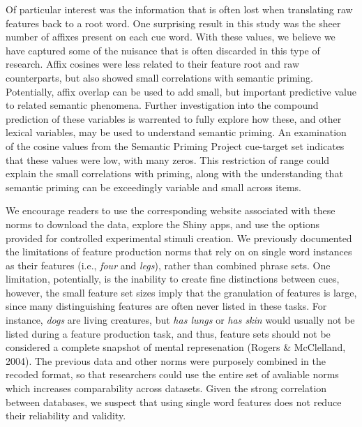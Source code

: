 \documentclass[english,man]{apa6}
\theoremstyle{definition}
\theoremstyle{definition}
\theoremstyle{definition}
\theoremstyle{remark}
\begin{document}
Of particular interest was the information that is often lost when
translating raw features back to a root word. One surprising result in
this study was the sheer number of affixes present on each cue word.
With these values, we believe we have captured some of the nuisance that
is often discarded in this type of research. Affix cosines were less
related to their feature root and raw counterparts, but also showed
small correlations with semantic priming. Potentially, affix overlap can
be used to add small, but important predictive value to related semantic
phenomena. Further investigation into the compound prediction of these
variables is warrented to fully explore how these, and other lexical
variables, may be used to understand semantic priming. An examination of
the cosine values from the Semantic Priming Project cue-target set
indicates that these values were low, with many zeros. This restriction
of range could explain the small correlations with priming, along with
the understanding that semantic priming can be exceedingly variable and
small across items.

We encourage readers to use the corresponding website associated with
these norms to download the data, explore the Shiny apps, and use the
options provided for controlled experimental stimuli creation. We
previously documented the limitations of feature production norms that
rely on on single word instances as their features (i.e., \emph{four}
and \emph{legs}), rather than combined phrase sets. One limitation,
potentially, is the inability to create fine distinctions between cues,
however, the small feature set sizes imply that the granulation of
features is large, since many distinguishing features are often never
listed in these tasks. For instance, \emph{dogs} are living creatures,
but \emph{has lungs} or \emph{has skin} would usually not be listed
during a feature production task, and thus, feature sets should not be
considered a complete snapshot of mental represenation (Rogers \&
McClelland, 2004). The previous data and other norms were purposely
combined in the recoded format, so that researchers could use the entire
set of avaliable norms which increases comparability across datasets.
Given the strong correlation between databases, we suspect that using
single word features does not reduce their reliability and validity.
\end{document}
